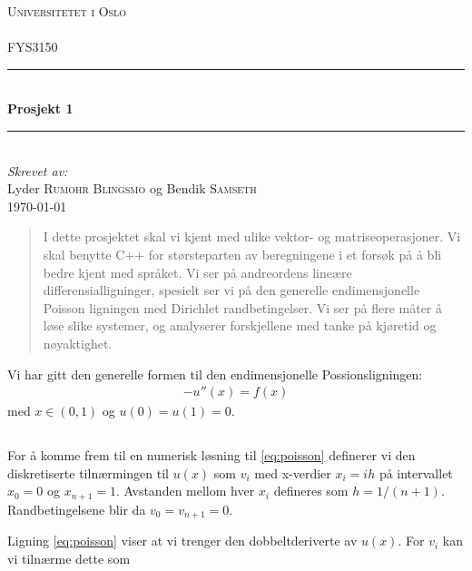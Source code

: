 \documentclass[11pt]{article}
\numberwithin{figure}{section} %
\numberwithin{table}{section} %
\begin{document}
\begin{titlepage}
\newcommand{\HRule}{\rule{\linewidth}{0.5mm}}
\center
\textsc{\LARGE Universitetet i Oslo}\\[1.5cm] %
\textsc{\Large }\\[0.5cm] %
\textsc{\large FYS3150}\\[0.5cm] %
\HRule \\[0.4cm]
{ \huge \bfseries Prosjekt 1 }\\[0.4cm] %
\HRule \\[1.5cm]
\Large \emph{Skrevet av:}\\
Lyder \textsc{Rumohr Blingsmo} og Bendik \textsc{Samseth}\\[3cm]
{\large \today}\\[3cm]
\vfill
\end{titlepage}


\begin{abstract}
I dette prosjektet skal vi kjent med ulike vektor- og
matriseoperasjoner. Vi skal benytte C++ for størsteparten av
beregningene i et forsøk på å bli bedre kjent med språket. Vi ser på
andreordens lineære differensialligninger, spesielt ser vi på den
generelle endimensjonelle Poisson ligningen med Dirichlet
randbetingelser. Vi ser på flere måter å løse slike systemer, og
analyserer forskjellene med tanke på kjøretid og nøyaktighet.
\end{abstract}


Vi har gitt den generelle formen til den endimensjonelle
Possionsligningen:
\begin{align}
  -u''(x) = f(x)\label{eq:poisson}
\end{align}
med $x \in (0,1)$ og $u(0) = u(1) = 0$.

\subsection{}

For å komme frem til en numerisk løsning til \eqref{eq:poisson}
definerer vi den diskretiserte tilnærmingen til $u(x)$ som $v_i$ med
x-verdier $x_i = ih$ på intervallet $x_0 = 0$ og $x_{n+1} =
1$. Avstanden mellom hver $x_i$ defineres som $h =
1/(n+1)$. Randbetingelsene blir da $v_0 = v_{n+1} = 0$.

Ligning \eqref{eq:poisson} viser at vi trenger den dobbeltderiverte av
$u(x)$. For $v_i$ kan vi tilnærme dette som 
\end{document}
